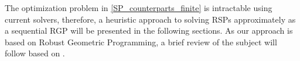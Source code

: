 The optimization problem in \eqref{SP_counterparts_finite} is intractable using current solvers, therefore,  a heuristic approach to solving RSPs approximately
as a sequential RGP will be presented in the following sections.
As our approach is based on Robust Geometric Programming, a brief review of the subject will follow based on \cite{Saab2018}.
